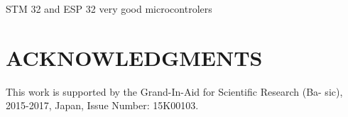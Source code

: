 \documentclass{aip-cp}
\begin{document}
STM 32 and ESP 32 very good microcontrolers




\section{ACKNOWLEDGMENTS}
This work is supported by the Grand-In-Aid for Scientific Research (Ba- sic), 2015-2017, Japan, Issue Number: 15K00103.


\nocite{*}
%
%
\end{document}
